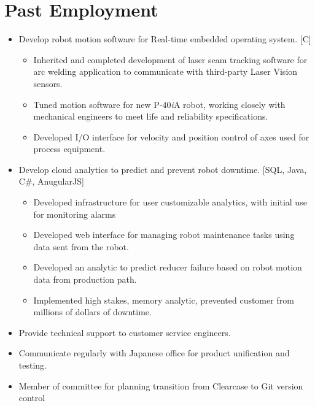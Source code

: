 \documentclass{BradyResume}
\begin{document}
\section*{Past Employment}
\firstlineskip
{}
\begin{itemize}
  \item Develop robot motion software for Real-time embedded operating system. [C]
  \begin{itemize}
  	  \item Inherited and completed development of  laser seam tracking software for arc welding application to communicate with third-party Laser Vision sensors.
	  \item Tuned motion software for new P-40{\it{i}}A robot, working closely with mechanical engineers to meet life and reliability specifications.
	  \item Developed I/O interface for velocity and position control of axes used for process equipment.
  \end{itemize}
  \item Develop cloud analytics to predict and prevent robot downtime. [SQL, Java, C\#, AnugularJS]
  \begin{itemize}
    \item Developed infrastructure for user customizable analytics, with initial use for monitoring alarms
    \item Developed web interface for managing robot maintenance tasks using data sent from the robot.
    \item Developed an analytic to predict reducer failure based on  robot motion data from production path.
    \item Implemented high stakes, memory analytic, prevented customer from millions of dollars of downtime.
  \end{itemize}
  \item Provide technical support to customer service engineers.
  
  \item Communicate regularly with Japanese office for product unification and testing.
  \item Member of committee for planning transition from Clearcase to Git version control

\end{itemize}
\end{document}
